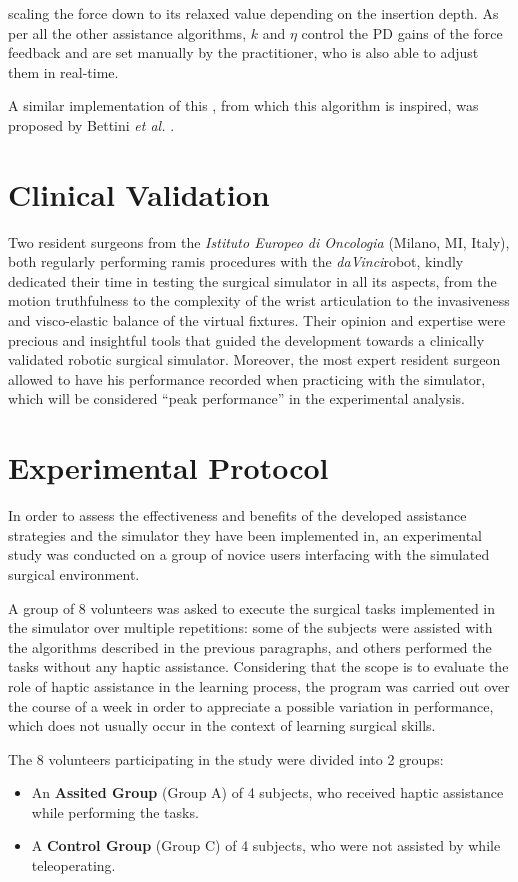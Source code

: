 \documentclass[../main.tex]{subfiles}
\begin{document}
scaling the force down to its relaxed value depending on the insertion depth. As per all the other assistance algorithms, $k$ and $\eta$ control the PD gains of the force feedback and are set manually by the practitioner, who is also able to adjust them in real-time.

A similar implementation of this \vf, from which this algorithm is inspired, was proposed by Bettini \textit{et al.} \cite{Bettini2004}.

\section{Clinical Validation}
Two resident surgeons from the \textit{Istituto Europeo di Oncologia} (Milano, MI, Italy), both regularly performing \ac{ramis} procedures with the \textit{daVinci}\cright robot, kindly dedicated their time in testing the surgical simulator in all its aspects, from the motion truthfulness to the complexity of the wrist articulation to the invasiveness and visco-elastic balance of the virtual fixtures. Their opinion and expertise were precious and insightful tools that guided the development towards a clinically validated robotic surgical simulator. 
Moreover, the most expert resident surgeon allowed to have his performance recorded when practicing with the simulator, which will be considered ``peak performance'' in the experimental analysis. 

\section{Experimental Protocol}
In order to assess the effectiveness and benefits of the developed assistance strategies and the simulator they have been implemented in, an experimental study was conducted on a group of novice users interfacing with the simulated surgical environment. 

A group of 8 volunteers was asked to execute the surgical tasks implemented in the simulator over multiple repetitions: some of the subjects were assisted with the \vf algorithms described in the previous paragraphs, and others performed the tasks without any haptic assistance. Considering that the scope is to evaluate the role of haptic assistance in the learning process, the program was carried out over the course of a week in order to appreciate a possible variation in performance, which does not usually occur in the context of learning surgical skills.

The 8 volunteers participating in the study were divided into 2 groups:
\begin{itemize}
    \item An \textbf{Assited Group} (Group A) of 4 subjects, who received haptic assistance while performing the tasks.
    \item A \textbf{Control Group} (Group C) of 4 subjects, who were not assisted by \vfs while teleoperating.
\end{itemize}
\end{document}
